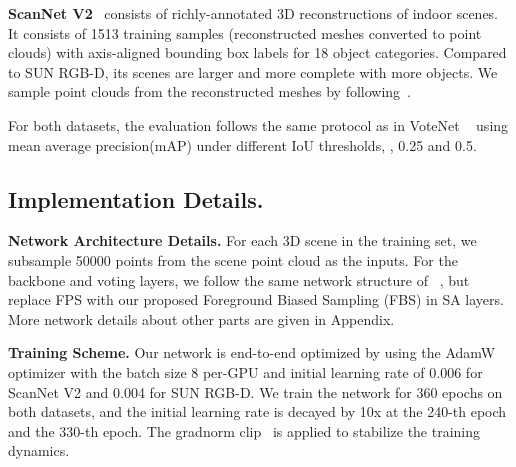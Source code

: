 \documentclass[final]{cvpr}
\begin{document}
\noindent \textbf{ScanNet V2}~\cite{dai2017scannet} consists of richly-annotated 3D reconstructions of indoor scenes. It consists of 1513 training samples (reconstructed meshes converted to point clouds) with axis-aligned bounding box labels for 18 object categories. Compared to SUN RGB-D, its scenes are larger and more complete with more objects. We sample point clouds from the reconstructed meshes by following~\cite{qi2019deep}.

For both datasets, the evaluation follows the same protocol as in VoteNet ~\cite{qi2019deep} using mean average precision(mAP) under different IoU thresholds, \ie, 0.25 and 0.5.
 

\subsection{Implementation Details.} \label{sec:imple_detail}
\noindent \textbf{Network Architecture Details.} For each 3D scene in the training set, we subsample 50000 points from the scene point cloud as the inputs. For the backbone and voting layers, we follow the same network structure of ~\cite{qi2019deep}, but replace FPS with our proposed Foreground Biased Sampling (FBS) in  SA layers. More network details about other parts are given in Appendix. 

\noindent \textbf{Training Scheme.} Our network is end-to-end optimized by using the AdamW optimizer with the batch size 8 per-GPU and initial learning rate of 0.006 for ScanNet V2 and 0.004 for SUN RGB-D. We train the network for 360 epochs on both datasets, and the initial learning rate is decayed by 10x at the 240-th epoch and the 330-th epoch. The gradnorm clip~\cite{zhang2020_b282d173, jin2021nonconvex} is applied to stabilize the training dynamics.\\
\end{document}
